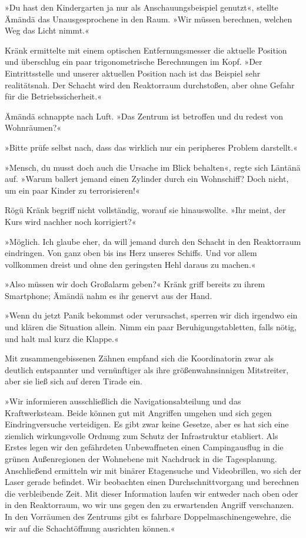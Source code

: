 »Du hast den Kindergarten ja nur als Anschauungsbeispiel genutzt«, stellte Ämändä das Unausgesprochene in den Raum. »Wir müssen berechnen, welchen Weg das Licht nimmt.«

Kränk ermittelte mit einem optischen Entfernungsmesser die aktuelle Position und überschlug ein paar trigonometrische Berechnungen im Kopf. »Der Eintrittsstelle und unserer aktuellen Position nach ist das Beispiel sehr realitätsnah. Der Schacht wird den Reaktorraum durchstoßen, aber ohne Gefahr für die Betriebssicherheit.«

Ämändä schnappte nach Luft. »Das Zentrum ist betroffen und du redest von Wohnräumen?«

»Bitte prüfe selbst nach, dass das wirklich nur ein peripheres Problem darstellt.«

»Mensch, du musst doch auch die Ursache im Blick behalten«, regte sich Läntänä auf. »Warum ballert jemand einen Zylinder durch ein Wohnschiff? Doch nicht, um ein paar Kinder zu terrorisieren!«

Rögü Kränk begriff nicht vollständig, worauf sie hinauswollte. »Ihr meint, der Kurs wird nachher noch korrigiert?«

»Möglich. Ich glaube eher, da will jemand durch den Schacht in den Reaktorraum eindringen. Von ganz oben bis ins Herz unseres Schiffs. Und vor allem vollkommen dreist und ohne den geringsten Hehl daraus zu machen.«

»Also müssen wir doch Großalarm geben?« Kränk griff bereits zu ihrem Smartphone; Ämändä nahm es ihr genervt aus der Hand.

»Wenn du jetzt Panik bekommst oder verursachst, sperren wir dich irgendwo ein und klären die Situation allein. Nimm ein paar Beruhigungstabletten, falls nötig, und halt mal kurz die Klappe.«

Mit zusammengebissenen Zähnen empfand sich die Koordinatorin zwar als deutlich entspannter und vernünftiger als ihre größenwahnsinnigen Mitstreiter, aber sie ließ sich auf deren Tirade ein.

»Wir informieren ausschließlich die Navigationsabteilung und das Kraftwerksteam. Beide können gut mit Angriffen umgehen und sich gegen Eindringversuche verteidigen. Es gibt zwar keine Gesetze, aber es hat sich eine ziemlich wirkungsvolle Ordnung zum Schutz der Infrastruktur etabliert. Als Erstes legen wir den gefährdeten Unbewaffneten einen Campingausflug in die grünen Außenregionen der Wohnebene mit Nachdruck in die Tagesplanung. Anschließend ermitteln wir mit binärer Etagensuche und Videobrillen, wo sich der Laser gerade befindet. Wir beobachten einen Durchschnittvorgang und berechnen die verbleibende Zeit. Mit dieser Information laufen wir entweder nach oben oder in den Reaktorraum, wo wir uns gegen den zu erwartenden Angriff verschanzen. In den Vorräumen des Zentrums gibt es fahrbare Doppelmaschinengewehre, die wir auf die Schachtöffnung ausrichten können.«

